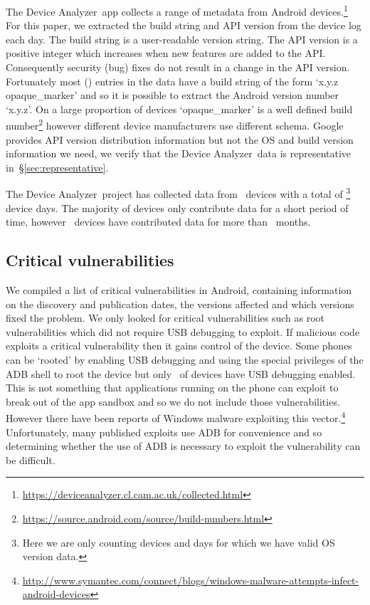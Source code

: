 \documentclass{llncs}
\newcommand{\da}{Device Analyzer}
\newcommand{\daNumDevices}{\daNumOSDevices}
\newcommand{\daDeviceDays}{\daOSTotalDaysData}
\begin{document}
The \da\ app collects a range of metadata from Android devices.\footnote{\url{https://deviceanalyzer.cl.cam.ac.uk/collected.html}}
For this paper, we extracted the build string and API version from the device log each day.
The build string is a user-readable version string.
The API version is a positive integer which increases when new features are added to the API.
Consequently security (bug) fixes do not result in a change in the API version.
Fortunately most (\daOSVersionPercValidLines) entries in the data have a build string of the form `x.y.z opaque\_marker' and so it is possible to extract the Android version number `x.y.z'.
On a large proportion of devices `opaque\_marker' is a well defined build number\footnote{\url{https://source.android.com/source/build-numbers.html}} however different device manufacturers use different schema.
Google provides API version distribution information but not the OS and build version information we need, we verify that the \da\ data is representative in~\S\ref{sec:representative}.

The \da\ project has collected data from \daNumDevices\ devices with a total of \daDeviceDays\footnote{Here we are only counting devices and days for which we have valid OS version data.} device days.
The majority of devices only contribute data for a short period of time, however \daMonthsDevices\ devices have contributed data for more than \daMonths~months.


\subsection{Critical vulnerabilities}
We compiled a list of critical vulnerabilities in Android, containing information on the discovery and publication dates, the versions affected and which versions fixed the problem.
We only looked for critical vulnerabilities such as root vulnerabilities which did not require USB debugging to exploit.
If malicious code exploits a critical vulnerability then it gains control of the device.
Some phones can be `rooted' by enabling USB debugging and using the special privileges of the ADB shell to root the device but only \daAdbEnabledPerc\ of devices have USB debugging enabled.
This is not something that applications running on the phone can exploit to break out of the app sandbox and so we do not include those vulnerabilities.
However there have been reports of Windows malware exploiting this vector.\footnote{\url{http://www.symantec.com/connect/blogs/windows-malware-attempts-infect-android-devices}}
Unfortunately, many published exploits use ADB for convenience and so determining whether the use of ADB is necessary to exploit the vulnerability can be difficult.
\end{document}
